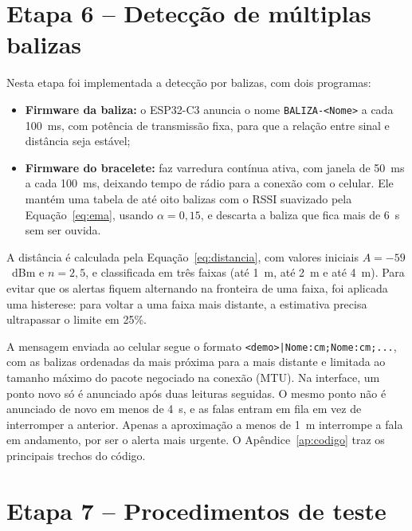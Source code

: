 \section{Etapa 6 -- Detecção de múltiplas balizas}
\label{sec:etapa6}

Nesta etapa foi implementada a detecção por balizas, com dois programas:
\begin{itemize}
    \item \textbf{Firmware da baliza:} o ESP32-C3 anuncia o nome \texttt{BALIZA-<Nome>} a cada 100~ms, com potência de transmissão fixa, para que a relação entre sinal e distância seja estável;
    \item \textbf{Firmware do bracelete:} faz varredura contínua ativa, com janela de 50~ms a cada 100~ms, deixando tempo de rádio para a conexão com o celular. Ele mantém uma tabela de até oito balizas com o RSSI suavizado pela Equação~\ref{eq:ema}, usando $\alpha = 0{,}15$, e descarta a baliza que fica mais de 6~s sem ser ouvida.
\end{itemize}

A distância é calculada pela Equação~\ref{eq:distancia}, com valores iniciais $A = -59$~dBm e $n = 2{,}5$, e classificada em três faixas (até 1~m, até 2~m e até 4~m). Para evitar que os alertas fiquem alternando na fronteira de uma faixa, foi aplicada uma histerese: para voltar a uma faixa mais distante, a estimativa precisa ultrapassar o limite em 25\%.

A mensagem enviada ao celular segue o formato \texttt{<demo>|Nome:cm;Nome:cm;...}, com as balizas ordenadas da mais próxima para a mais distante e limitada ao tamanho máximo do pacote negociado na conexão (MTU). Na interface, um ponto novo só é anunciado após duas leituras seguidas. O mesmo ponto não é anunciado de novo em menos de 4~s, e as falas entram em fila em vez de interromper a anterior. Apenas a aproximação a menos de 1~m interrompe a fala em andamento, por ser o alerta mais urgente. O Apêndice~\ref{ap:codigo} traz os principais trechos do código.

\section{Etapa 7 -- Procedimentos de teste}
\label{sec:etapa7}


